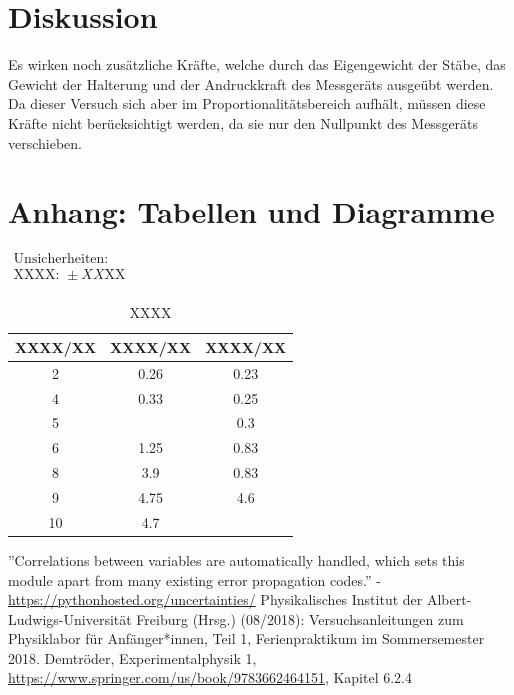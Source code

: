 \documentclass[11pt,a4paper]{article}
\begin{document}
\section{Diskussion}

Es wirken noch zus\"atzliche Kr\"afte, welche durch das Eigengewicht der St\"abe, das Gewicht der Halterung und der Andruckkraft des Messger\"ats ausge\"ubt werden. Da dieser Versuch sich aber im Proportionalit\"atsbereich aufh\"alt, m\"ussen diese Kr\"afte nicht ber\"ucksichtigt werden, da sie nur den Nullpunkt des Messger\"ats verschieben.

\pagebreak

\section{Anhang: Tabellen und Diagramme}

\begin{table}[h]
\centering
\caption{XXXX} \vspace{11pt}
$\begin{array}{l}
\textrm{Unsicherheiten:}\\
\textrm{XXXX: } \pm XX \textrm{XX}\\
\end{array}$
\begin{tabular}{ccc}
\toprule
\textrm{XXXX}/\textrm{XX} & \textrm{XXXX}/\textrm{XX} & \textrm{XXXX}/\textrm{XX} \\
\midrule 
2 & 0.26 & 0.23\\
\hline
4 & 0.33 & 0.25\\
\hline 
5 & & 0.3\\
\hline 
6 & 1.25 & 0.83\\
\hline 
8 & 3.9 & 0.83\\ 
\hline
9 & 4.75 & 4.6\\ 
\hline
10 & 4.7 &\\ 
\bottomrule
\end{tabular}
\label{Tab:X}
\end{table}


\begin{thebibliography}{9}
''Correlations between variables are automatically handled, which sets this module apart from many existing error propagation codes.'' - \url{https://pythonhosted.org/uncertainties/}
 Physikalisches Institut der Albert-Ludwigs-Universität Freiburg (Hrsg.) (08/2018): Versuchsanleitungen zum Physiklabor für Anfänger*innen, Teil 1, Ferienpraktikum im Sommersemester 2018.
 Demtr\"oder, Experimentalphysik 1, \url{https://www.springer.com/us/book/9783662464151}, Kapitel 6.2.4
\end{thebibliography}
\end{document}
